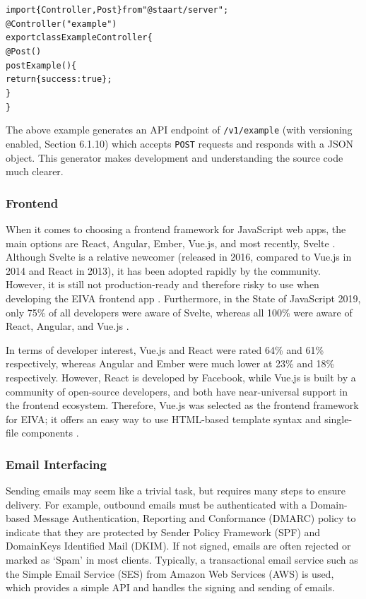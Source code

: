 \documentclass{article}
\begin{document}
\begin{alltt}
\textcolor{keyword}{import} \{ Controller, Post \} \textcolor{keyword}{from} \textcolor{string}{"@staart/server"};
@Controller(\textcolor{string}{"example"})
\textcolor{keyword}{export class} ExampleController \{
  @Post()
  \textcolor{variable}{postExample}() \{
    \textcolor{keyword}{return} \{ \textcolor{symbol}{success}: \textcolor{literal}{true} \};
  \}
\}
\end{alltt}

The above example generates an API endpoint of \texttt{/v1/example} (with versioning enabled, Section 6.1.10) which accepts \texttt{POST} requests and responds with a JSON object. This generator makes development and understanding the source code much clearer.

\subsubsection{Frontend}

When it comes to choosing a frontend framework for JavaScript web apps, the main options are React, Angular, Ember, Vue.js, and most recently, Svelte \cite{delcev_modern_2018}. Although Svelte is a relative newcomer (released in 2016, compared to Vue.js in 2014 and React in 2013), it has been adopted rapidly by the community. However, it is still not production-ready and therefore risky to use when developing the EIVA frontend app \cite{noauthor_svelte:_2019}. Furthermore, in the State of JavaScript 2019, only 75\% of all developers were aware of Svelte, whereas all 100\% were aware of React, Angular, and Vue.js \cite{noauthor_state_nodate}.

In terms of developer interest, Vue.js and React were rated 64\% and 61\% respectively, whereas Angular and Ember were much lower at 23\% and 18\% respectively. However, React is developed by Facebook, while Vue.js is built by a community of open-source developers, and both have near-universal support in the frontend ecosystem. Therefore, Vue.js was selected as the frontend framework for EIVA; it offers an easy way to use HTML-based template syntax and single-file components \cite{deng_development_2020}.

\subsubsection{Email Interfacing}

Sending emails may seem like a trivial task, but requires many steps to ensure delivery. For example, outbound emails must be authenticated with a Domain-based Message Authentication, Reporting and Conformance (DMARC) policy to indicate that they are protected by Sender Policy Framework (SPF) and DomainKeys Identified Mail (DKIM). If not signed, emails are often rejected or marked as `Spam' in most clients. Typically, a transactional email service such as the Simple Email Service (SES) from Amazon Web Services (AWS) is used, which provides a simple API and handles the signing and sending of emails.
\end{document}

